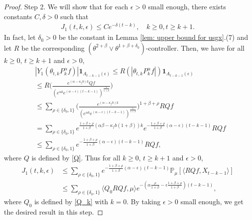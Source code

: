 \documentclass[12pt,a4paper]{amsart}
\theoremstyle{plain}
\theoremstyle{definition}
\numberwithin{equation}{section}
\begin{document}
\begin{proof}
Step 2.  We will show that for each $\epsilon>0$ small enough, there exists constants $C, \delta>0$ such that
    \begin{equation}\begin{split}
    \label{lemma31q}
      J_1(t,k,\epsilon)
      \leq Ce^{-\delta (t-k)},
      \quad k\geq 0, t\geq k+1.
    \end{split}\end{equation}
    In fact, let $\delta_0 >0$ be the constant in Lemma \ref{lem: upper bound for usgx}.(7) and let $R$ be the corresponding $(\theta^{2+\beta}\vee \theta^{1+\beta+\delta_0})$-controller.
    Then, we have for all $k\geq 0$, $t\geq k+1$ and $\epsilon> 0$,
\begin{equation}\begin{split}
   & |Y_1(\theta_{t,k}P^\alpha_k f)|\mathbf{1}_{A_{t-k-1}(\epsilon)}
   \leq R(|\theta_{t,k}P^\alpha_k f|)\mathbf{1}_{A_{t-k-1}(\epsilon)}
   \\&\leq R \Big(\frac{e^{(\alpha-\kappa_fb)k} Qf}{(e^{\alpha k}e^{(\alpha-\epsilon)(t-k-1)})^\frac{1}{1+\beta}}\Big)
   \\&\leq \sum_{\rho \in \{\delta_0, 1\}}\Big(\frac{e^{(\alpha-\kappa_fb)k}}{(e^{\alpha k}e^{(\alpha-\epsilon)(t-k-1)})^\frac{1}{1+\beta}}\Big)^{1+\beta+ \rho} RQf
   \\&=\sum_{\rho \in \{\delta_0, 1\}}e^{\frac{1+\beta + \rho}{1+\beta}(\alpha\beta-\kappa_fb(1+\beta))k}e^{-\frac{1+\beta+\rho}{1+\beta} (\alpha-\epsilon)(t-k-1)}RQf
   \\&\leq \sum_{\rho \in \{\delta_0,1\}}e^{-\frac{1+\beta+\rho}{1+\beta}(\alpha-\epsilon)(t-k-1)}RQf,
\end{split}\end{equation}
where $Q$ is defined by \eqref{Q}.
Thus for all $k\geq 0$, $t\geq k+1$ and $\epsilon> 0$,
\begin{equation}\begin{split}
\label{eq: estimate of J1}
     J_1(t,k,\epsilon)&
     \leq \sum_{\rho \in \{\delta_0,1\}}e^{-\frac{1+\beta+\rho}{1+\beta}(\alpha-\epsilon)(t-k-1)}\mathbb{P}_{\mu}[\langle RQf,X_{t-k-1}\rangle]\\
     & \leq \sum_{\rho \in \{\delta_0,1\}} \langle Q_0 RQf, \mu \rangle e^{-(\alpha\frac{\rho}{1+\beta}-\epsilon\frac{1+\beta+\rho}{1+\beta})(t-k-1)},
\end{split}\end{equation}
where $Q_0$ is defined by \eqref{Q_k} with $k=0$.
    By taking $\epsilon>0$ small enough, we get the desired result in this step.


\end{proof}
\end{document}
